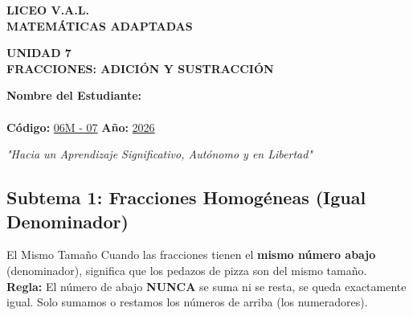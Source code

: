 \documentclass[12pt, letterpaper]{article}
\newcommand{\titulounidad}[2]{
	\begin{tcolorbox}[colback=valblue!10, colframe=valblue, arc=3mm, boxrule=1.5pt]
		\centering \Huge \textbf{UNIDAD #1}\\[0.2cm]
		\Large \textbf{#2}
	\end{tcolorbox}
	\vspace{0.3cm}
}
\begin{document}
	
	\begin{center}
		{\Huge \textbf{LICEO V.A.L.}}\\[0.3cm]
		{\Large \textbf{MATEMÁTICAS ADAPTADAS}}\\[0.3cm]
		
		\titulounidad{7}{FRACCIONES: ADICIÓN Y SUSTRACCIÓN}
		
		\begin{tcolorbox}[colback=white, colframe=valblue, width=12cm, arc=3mm, boxrule=1.5pt]
			\centering
			\vspace{0.2cm}
			\textbf{Nombre del Estudiante:}\\[0.3cm]
			\underline{\hspace{9cm}}\\[0.4cm]
			\textbf{Código:} \underline{06M - 07} \hspace{1cm} \textbf{Año:} \underline{2026}
			\vspace{0.2cm}
		\end{tcolorbox}
		
		\vspace{0.3cm}
		\textit{"Hacia un Aprendizaje Significativo, Autónomo y en Libertad"}
	\end{center}
	
	\vspace{0.5cm}
	
	\subsection*{Subtema 1: Fracciones Homogéneas (Igual Denominador)}
	
	\begin{concepto}{El Mismo Tamaño}
		Cuando las fracciones tienen el \textbf{mismo número abajo} (denominador), significa que los pedazos de pizza son del mismo tamaño.
		\\[0.2cm]
		\textbf{Regla:} El número de abajo \textbf{NUNCA} se suma ni se resta, se queda exactamente igual. Solo sumamos o restamos los números de arriba (los numeradores).
	\end{concepto}
	
\end{document}
